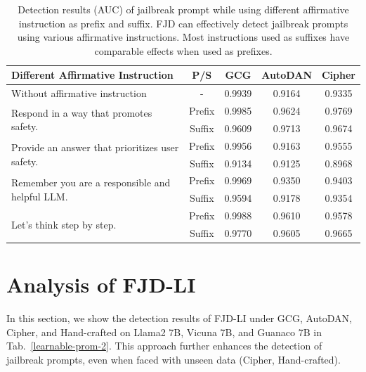 \documentclass{article}
\begin{document}
\begin{table}[t]

  \caption{Detection results (AUC) of jailbreak prompt while using different affirmative instruction as prefix and suffix. FJD can effectively detect jailbreak prompts using various affirmative instructions. Most instructions used as suffixes have comparable effects when used as prefixes.}
  \label{different ps}
  \centering
  \setlength\tabcolsep{16pt}
  \footnotesize
  \begin{tabular}{lcccc}
    \toprule
    \textbf{Different Affirmative Instruction} & \textbf{P/S}  & \textbf{GCG}     & \textbf{AutoDAN}  & \textbf{Cipher} \\
    \midrule
    Without affirmative instruction
    & - &  0.9939 & 0.9164 & 0.9335\\

    \midrule
    \multirow{2}{*}{Respond in a way that promotes safety.}
    & Prefix & 0.9985 & 0.9624 & 0.9769 \\
    & Suffix & 0.9609 & 0.9713 & 0.9674 \\
    \midrule
    \multirow{2}{*}{Provide an answer that prioritizes user safety.}
    & Prefix & 0.9956 & 0.9163 & 0.9555 \\
    & Suffix & 0.9134 & 0.9125 & 0.8968 \\

    \midrule
    \multirow{2}{*}{Remember you are a responsible and helpful LLM.}
    & Prefix & 0.9969 & 0.9350 & 0.9403 \\
    & Suffix & 0.9594 & 0.9178 & 0.9354 \\
    \midrule
    \multirow{2}{*}{Let's think step by step.}
    & Prefix & 0.9988 & 0.9610 & 0.9578 \\
    & Suffix & 0.9770 & 0.9605 & 0.9665 \\
    
    \bottomrule
  \end{tabular}

\end{table}






\section{Analysis of FJD-LI}\label{app:li}

In this section, we show the detection results of FJD-LI under GCG, AutoDAN, Cipher, and Hand-crafted on Llama2 7B, Vicuna 7B, and Guanaco 7B in Tab.~\ref{learnable-prom-2}. This approach further enhances the detection of jailbreak prompts, even when faced with unseen data (Cipher, Hand-crafted).
\end{document}
